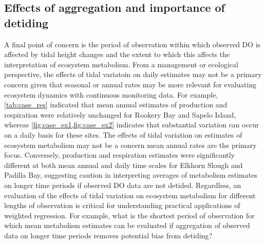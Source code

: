 \documentclass[letterpaper,12pt,oneside]{article}\usepackage[]{graphicx}\usepackage[]{color}
\begin{document}
\subsection{Effects of aggregation and importance of detiding}

A final point of concern is the period of observation within which observed \ac{DO} is affected by tidal height changes and the extent to which this affects the interpretation of ecosystem metabolism.  From a management or ecological perspective, the effects of tidal variatoin on daily estimates may not be a primary concern given that seasonal or annual rates may be more relevant for evaluating ecosystem dynamics with continuous monitoring data.  For example, \cref{tab:case_res} indicated that mean annual estimates of production and respiration were relatively unchanged for Rookery Bay and Sapelo Island, whereas \cref{fig:case_ex1,fig:case_ex2} indicates that substantial variation can occur on a daily basis for these sites.  The effects of tidal variation on estimates of ecosystem metabolism may not be a concern mean annual rates are the primary focus.  Conversely, production and respiration estimates were significantly different at both mean annual and daily time scales for Elkhorn Slough and Padilla Bay, suggesting caution in interpreting averages of metabolism estimates on longer time periods if observed \ac{DO} data are not detided. Regardless, an evaluation of the effects of tidal variation on ecosystem metabolism for different lengths of observation is critical for understanding practical applications of weighted regression.  For example, what is the shortest period of observation for which mean metabolism estimates can be evaluated if aggregation of observed data on longer time periods removes potential bias from detiding?  
\end{document}
